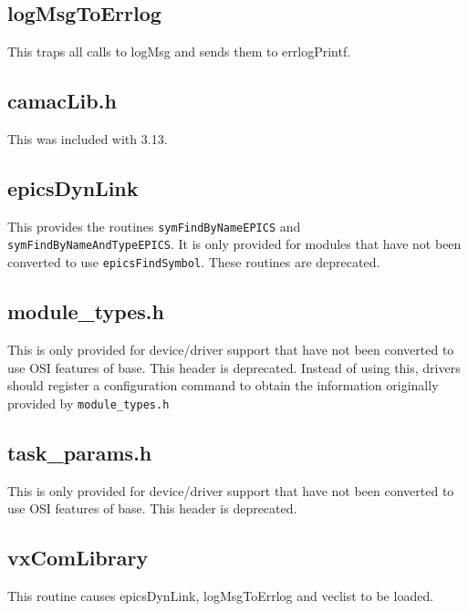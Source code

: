 \subsection{logMsgToErrlog}

This traps all calls to logMsg and sends them to errlogPrintf.

\subsection{camacLib.h}

This was included with 3.13.

\subsection{epicsDynLink}

This provides the routines \verb|symFindByNameEPICS| and \verb|symFindByNameAndTypeEPICS|.
It is only provided for modules that have not been converted to use \verb|epicsFindSymbol|.
These routines are deprecated.

\subsection{module\_types.h}

This is only provided for device/driver support that have not been converted to use OSI features of base.
This header is deprecated.
Instead of using this, drivers should register a configuration command to obtain
the information originally provided by \verb|module_types.h|

\subsection{task\_params.h}

This is only provided for device/driver support that have not been converted to use OSI features of base.
This header is deprecated.

\subsection{vxComLibrary}

This routine causes epicsDynLink, logMsgToErrlog and veclist to be loaded.
